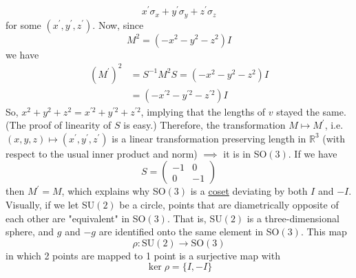 \documentclass{article}
\begin{document}
    \begin{equation}
      x^\prime \sigma_x + y^\prime \sigma_y + z^\prime \sigma_z
    \end{equation}
    for some $(x^\prime, y^\prime, z^\prime)$. Now, since 
    \begin{equation}
      M^2 = (-x^2 - y^2 - z^2) I
    \end{equation}
    we have 
    \begin{align*}
      (M^\prime)^2 & = S^{-1} M^2 S = (-x^2 - y^2 - z^2) I \\
      & = (-x^{\prime 2} - y^{\prime 2} - z^{\prime 2}) I 
    \end{align*}
    So, $x^2 + y^2 + z^2 = x^{\prime 2} + y^{\prime 2} + z^{\prime 2}$, implying that the lengths of $v$ stayed the same. (The proof of linearity of $S$ is easy.) Therefore, the transformation $M \mapsto M^\prime$, i.e. $(x, y, z) \mapsto (x^\prime, y^\prime, z^\prime)$ is a linear transformation preserving length in $\mathbb{R}^3$ (with respect to the usual inner product and norm) $\implies$ it is in SO$(3)$. If we have
    \begin{equation}
      S  = \begin{pmatrix}
      -1&0\\0&-1
      \end{pmatrix}
    \end{equation}
    then $M^\prime = M$, which explains why SO$(3)$ is a \hyperref[alg-def:coset]{coset} deviating by both $I$ and $-I$. Visually, if we let SU$(2)$ be a circle, points that are diametrically opposite of each other are "equivalent" in SO$(3)$. That is, SU$(2)$ is a three-dimensional sphere, and $g$ and $-g$ are identified onto the same element in SO$(3)$. This map
    \begin{equation}
      \rho: \text{SU}(2) \rightarrow \text{SO}(3)
    \end{equation}
    in which 2 points are mapped to 1 point is a surjective map with
    \begin{equation}
      \ker{\rho} = \{I, -I\}
    \end{equation}
    \begin{center}
    \end{center}
\end{document}
